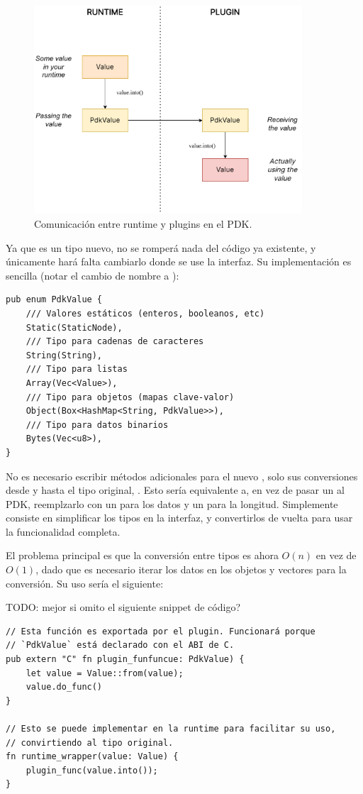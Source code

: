\begin{figure}
    \centering
    \includegraphics[width=10cm]{./Imagenes/simplify.pdf}
    \caption{Comunicación entre runtime y plugins en el PDK.}%
    \label{fig:simplify}
\end{figure}

Ya que es un tipo nuevo, no se romperá nada del código ya existente, y
únicamente hará falta cambiarlo donde se use la interfaz. Su implementación es
sencilla (notar el cambio de nombre a ):

\begin{verbatim}
pub enum PdkValue {
    /// Valores estáticos (enteros, booleanos, etc)
    Static(StaticNode),
    /// Tipo para cadenas de caracteres
    String(String),
    /// Tipo para listas
    Array(Vec<Value>),
    /// Tipo para objetos (mapas clave-valor)
    Object(Box<HashMap<String, PdkValue>>),
    /// Tipo para datos binarios
    Bytes(Vec<u8>),
}
\end{verbatim}

No es necesario escribir métodos adicionales para el nuevo , solo
sus conversiones desde y hasta el tipo original, . Esto sería
equivalente a, en vez de pasar un  al PDK, reemplzarlo con un
 para los datos y un  para la longitud. Simplemente
consiste en simplificar los tipos en la interfaz, y convertirlos de vuelta para
usar la funcionalidad completa.

El problema principal es que la conversión entre tipos es ahora $O(n)$ en vez de
$O(1)$, dado que es necesario iterar los datos en los objetos y vectores para la
conversión. Su uso sería el siguiente:

TODO: mejor si omito el siguiente snippet de código?

\begin{verbatim}
// Esta función es exportada por el plugin. Funcionará porque
// `PdkValue` está declarado con el ABI de C.
pub extern "C" fn plugin_funfuncue: PdkValue) {
    let value = Value::from(value);
    value.do_func()
}

// Esto se puede implementar en la runtime para facilitar su uso,
// convirtiendo al tipo original.
fn runtime_wrapper(value: Value) {
    plugin_func(value.into());
}
\end{verbatim}

